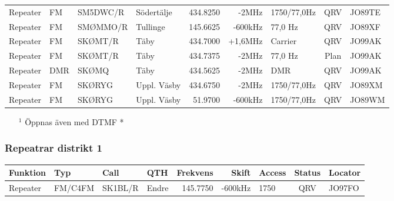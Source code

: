 \begin{landscape}
\begin{longtable}{llllrrlcl}
	Repeater          & FM           & SM5DWC/R      & Södertälje   & 434.8250          & -2MHz          & 1750/77,0Hz     & QRV             & JO89TE           \\
	Repeater          & FM           & SMØMMO/R      & Tullinge     & 145.6625          & -600kHz        & 77,0 Hz         & QRV             & JO89XF           \\
	Repeater          & FM           & SKØMT/R       & Täby         & 434.7000          & +1,6MHz        & Carrier         & QRV             & JO99AK           \\
	Repeater          & FM           & SKØMT/R       & Täby         & 434.7375          & -2MHz          & 77,0 Hz         & Plan            & JO99AK           \\
	Repeater          & DMR          & SKØMQ         & Täby         & 434.5625          & -2MHz          & DMR             & QRV             & JO99AK           \\
	Repeater          & FM           & SKØRYG        & Uppl. Väsby  & 434.6750          & -2MHz          & 1750/77,0Hz     & QRV             & JO89XM           \\
	Repeater          & FM           & SKØRYG        & Uppl. Väsby  & 51.9700           & -600kHz        & 1750/77,0Hz     & QRV             & JO89WM
\end{longtable}
\begin{itemize}
	\item[$^1$] Öppnas även med DTMF *
\end{itemize}
\normalsize

\clearpage

\subsubsection{Repeatrar distrikt 1}
\footnotesize
\begin{longtable}{llllrrlcl}
\textbf{Funktion} & \textbf{Typ} & \textbf{Call} & \textbf{QTH} & \textbf{Frekvens} & \textbf{Skift} & \textbf{Access} & \textbf{Status} & \textbf{Locator} \\ \hline \endhead
Repeater          & FM/C4FM      & SK1BL/R       & Endre	& 145.7750          & -600kHz        & 1750            & QRV             & JO97FO           \\
\end{longtable}
\normalsize


\end{landscape}
